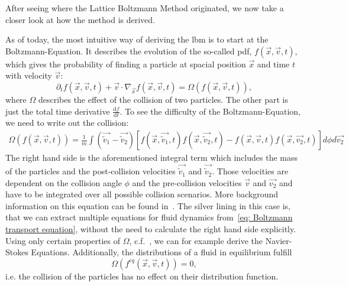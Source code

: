 
After seeing where the Lattice Boltzmann Method originated, we now take a closer look at how the method is derived.

As of today, the most intuitive way of deriving the \gls{lbm} is to start at the Boltzmann-Equation.
It describes the evolution of the so-called \gls{pdf}, $f(\vec{x},\vec{v},t)$, which gives the probability of finding a particle at spacial position $\vec{x}$ and time $t$ with velocity $\vec{v}$:
\begin{equation}
  \label{eq: Boltzmann transport equation}
  \partial_t f(\vec{x},\vec{v},t) + \vec{v}\cdot \nabla_\vec{x} f(\vec{x},\vec{v},t) = \Omega\left(f(\vec{x},\vec{v},t)\right),
\end{equation}
where $\Omega$ describes the effect of the collision of two particles. The other part is just the total time derivative $\frac{\text{d}f}{\text{d}t}$. To see the difficulty of the Boltzmann-Equation, we need to write out the collision:
\begin{equation}
  \label{eq: Collision of boltzmann equation}
  \begin{aligned}
 \Omega\left(f(\vec{x},\vec{v},t)\right) =\frac{1}{m}
  \int \left( \vec{\tilde{v}_1}-\vec{\tilde{v}_2}\right)
  \left[
    f(\vec{x},\vec{\tilde{v}_1},t)f(\vec{x},\vec{\tilde{v}_2},t)
    -f(\vec{x},\vec{v},t)f(\vec{x},\vec{v_2},t)
  \right] d\phi d\vec{v_2}
\end{aligned}
\end{equation}
The right hand side is the aforementioned integral term which includes the mass of the particles and the post-collision velocities $\vec{\tilde{v}_1}$ and $\vec{\tilde{v}_2}$.
Those velocities are dependent on the collision angle $\phi$ and the pre-collision velocities $\vec{v}$ and $\vec{v_2}$ and have to be integrated over all possible collision scenarios.
More background information on this equation can be found in~\cite{harris2004introduction}.
The silver lining in this case is, that we can extract multiple equations for fluid dynamics from~\eqref{eq: Boltzmann transport equation}, without the need to calculate the right hand side explicitly.
Using only certain properties of $\Omega$, c.f.~\cite[Pages 26 ff.]{harris2004introduction}, we can for example derive the Navier-Stokes Equations.
Additionally, the distributions of a fluid in equilibrium fulfill
\begin{equation}
  \Omega(f^{eq}(\vec{x},\vec{v},t)) = 0,
\end{equation}
i.e. the collision of the particles has no effect on their distribution function.
